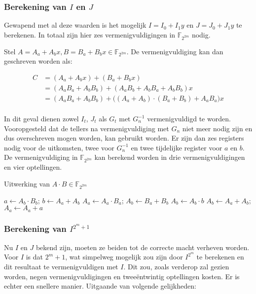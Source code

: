 \subsubsection{Berekening van $I$ en $J$}

Gewapend met al deze waarden is het mogelijk $I = I_0 + I_1 y$ en $J = J_0 + J_1 y$ te berekenen. In totaal zijn hier zes vermenigvuldigingen in $\mathbb{F}_{2^{2m}}$ nodig. 

Stel $A = A_a + A_b x, B = B_a + B_b x \in \mathbb{F}_{2^{2m}}$. De vermenigvuldiging kan dan geschreven worden als:

\[\begin{aligned}
C	&= (A_a + A_b x) + (B_a + B_b x)\\
	&= (A_a B_a + A_b B_b) + (A_a B_b + A_b B_a + A_b B_b)x\\
	&= (A_a B_a + A_b B_b) + \bigl( (A_a + A_b) \cdot (B_a + B_b) + A_a B_a \bigr) x\\
\end{aligned}\]

In dit geval dienen zowel $I_t$, $J_t$ als $G_t$ met $G_n^{-1}$ vermenigvuldigd te worden. Vooropgesteld dat de tellers na vermenigvuldiging met $G_n$ niet meer nodig zijn en dus overschreven mogen worden, kan  gebruikt worden. Er zijn dan zes registers nodig voor de uitkomsten, twee voor $G_n^{-1}$ en twee tijdelijke register voor $a$ en $b$. De vermenigvuldiging in $\mathbb{F}_{2^{2m}}$ kan berekend worden in drie vermenigvuldigingen en vier optellingen.

\begin{algorithm}[h]
	\caption{Uitwerking van $A \cdot B \in \mathbb{F}_{2^{2m}}$}
	\label{algoritme-implementatie-miller-f2m-mult}
	$a \leftarrow A_b \cdot B_b$; $b \leftarrow A_a + A_b$\;
	$A_a \leftarrow A_a \cdot B_a$; $A_b \leftarrow B_a + B_b$\;
	$A_b \leftarrow A_b \cdot b$\;
	$A_b \leftarrow A_a + A_b$; $A_a \leftarrow A_a + a$\;
\end{algorithm}

\subsubsection{Berekening van $I^{2^m + 1}$}

Nu $I$ en $J$ bekend zijn, moeten ze beiden tot de correcte macht verheven worden. Voor $I$ is dat $2^m + 1$, wat simpelweg mogelijk zou zijn door $I^{2^m}$ te berekenen en dit resultaat te vermenigvuldigen met $I$. Dit zou, zoals verderop zal gezien worden, negen vermenigvuldigingen en twee\"entwintig optellingen kosten. Er is echter een snellere manier. Uitgaande van volgende gelijkheden:

